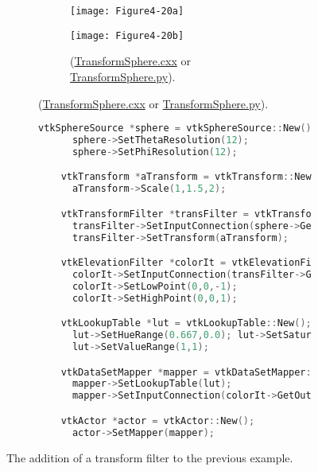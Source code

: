\begin{description}[leftmargin=0cm,labelindent=0cm]
\begin{figure}[htb]
    \centering
    \begin{subfigure}[h]{0.96\linewidth}
      \begin{subfigure}[h]{0.48\linewidth}
        \texttt{[image: Figure4-20a]}
        \caption*{}
        \label{fig:Figure4-20a}
      \end{subfigure}
      \hfill
      \begin{subfigure}[h]{0.48\linewidth}
        \texttt{[image: Figure4-20b]}
        \caption*{(\href{https://lorensen.github.io/VTKExamples/site/Cxx/Rendering/TransformSphere/}{TransformSphere.cxx} or \href{https://lorensen.github.io/VTKExamples/site/Python/Rendering/TransformSphere/}{TransformSphere.py}).}
        \label{fig:Figure4-20b}
      \end{subfigure}
  \end{subfigure}
  \hfill
  \begin{subfigure}[h]{0.76\linewidth}
    \begin{lstlisting}[language=C++, caption={Warped Sphere.}]
    vtkSphereSource *sphere = vtkSphereSource::New();
      sphere->SetThetaResolution(12);
      sphere->SetPhiResolution(12);

    vtkTransform *aTransform = vtkTransform::New();
      aTransform->Scale(1,1.5,2);

    vtkTransformFilter *transFilter = vtkTransformFilter::New();
      transFilter->SetInputConnection(sphere->GetOutputPort());
      transFilter->SetTransform(aTransform);

    vtkElevationFilter *colorIt = vtkElevationFilter::New();
      colorIt->SetInputConnection(transFilter->GetOutputPort());
      colorIt->SetLowPoint(0,0,-1);
      colorIt->SetHighPoint(0,0,1);

    vtkLookupTable *lut = vtkLookupTable::New();
      lut->SetHueRange(0.667,0.0); lut->SetSaturationRange(1,1);
      lut->SetValueRange(1,1);

    vtkDataSetMapper *mapper = vtkDataSetMapper::New();
      mapper->SetLookupTable(lut);
      mapper->SetInputConnection(colorIt->GetOutputPort());

    vtkActor *actor = vtkActor::New();
      actor->SetMapper(mapper);
    \end{lstlisting}
    \caption*{}
    \label{fig:Figure4-20c}
  \end{subfigure}
  \caption{The addition of a transform filter to the previous example.}\label{fig:Figure4-20}
\end{figure}


\end{description}

